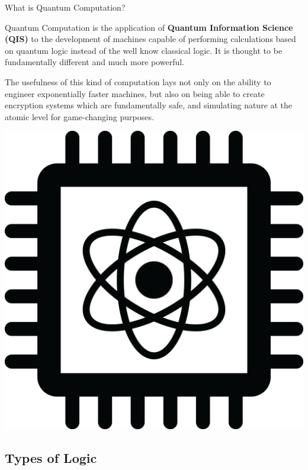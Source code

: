 \documentclass[9pt, handout, aspectratio=169]{beamer}		%
\begin{document}
	\begin{frame}{What is Quantum Computation?}
		
		Quantum Computation is the application of \textbf{Quantum Information Science (QIS)} to the development of machines capable of performing calculations based on quantum logic instead of the well know classical logic. It is thought to be fundamentally different and much more powerful. 

		\begin{multicols}{2}
		
		The usefulness of this kind of computation lays not only on the ability to engineer exponentially faster machines, but also on being able to create encryption systems which are fundamentally safe, and simulating nature at the atomic level for game-changing purposes.
		
			\begin{center}
		\includegraphics[width=.30\paperwidth]{Figures/Quantum_Chip}
			\end{center}
		
		\end{multicols}
		
	\end{frame}
	
	
	\subsection{Types of Logic}
	
\end{document}
